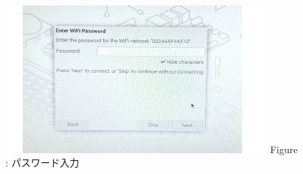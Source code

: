\documentclass[a4paper,12pt]{jarticle}
\begin{document}
\begin{enumerate}
\begin{itemize}
                      \begin{figure}[h]
                        \centering
                        \begin{minipage}{5.228cm}
                          {\upshape
                            \includegraphics[width=10.000cm]{pswd_image_0404.png}
                            \newline
                            Figure {\theFigure\label{seq:refFigure17}}:
                            パスワード入力}
                        \end{minipage}
                      \end{figure}
                      

\end{itemize}
\end{enumerate}
\end{document}
